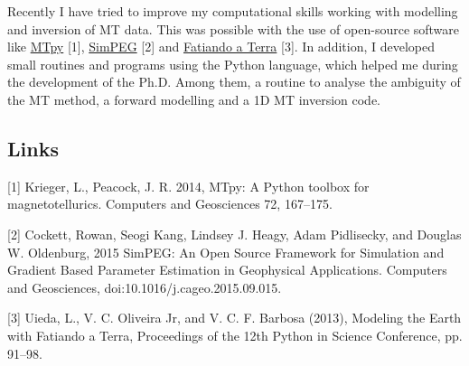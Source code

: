 \documentclass[10pt,a4paper,sans]{moderncv} %
\begin{document}
Recently I have tried to improve my computational skills working with modelling and inversion of MT data. This was possible with the use of open-source software like \href{http://www.sciencedirect.com/science/article/pii/S0098300414001794}{MTpy} [1], \href{http://www.simpeg.xyz/}{SimPEG} [2] and \href{http://www.fatiando.org/}{Fatiando a Terra} [3]. In addition, I developed small routines and programs using the Python language, which helped me during the development of the Ph.D. Among them, a routine to analyse the ambiguity of the MT method, a forward modelling and a 1D MT inversion code.


\subsection{Links}
[1] Krieger, L., Peacock, J. R. 2014, MTpy: A Python toolbox for magnetotellurics. Computers and Geosciences 72, 167--175.

[2] Cockett, Rowan, Seogi Kang, Lindsey J. Heagy, Adam Pidlisecky, and Douglas W. Oldenburg, 2015 SimPEG: An Open Source Framework for Simulation and Gradient Based Parameter Estimation in Geophysical Applications. Computers and Geosciences,  doi:10.1016/j.cageo.2015.09.015.

[3] Uieda, L., V. C. Oliveira Jr, and V. C. F. Barbosa (2013), Modeling the Earth with Fatiando a Terra, Proceedings of the 12th Python in Science Conference, pp. 91--98.
\end{document}
